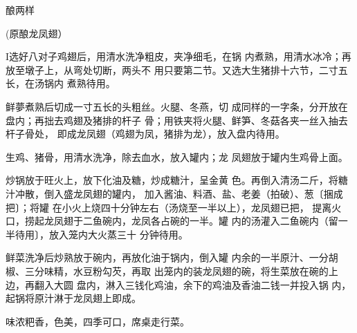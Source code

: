 \begin{recipe}{酿两样}

(原酿龙凤翅）

\ingredients


\cooking

I选好八对子鸡翅后，用清水洗净粗皮，夹净细毛，在锅 内煮熟，用清水冰冷；再放至墩子上，从弯处切断，两头不 用只要第二节。又选大生猪排十六节，二寸五长，在汤锅内 煮熟待用。

\step 	鲜夢煮熟后切成一寸五长的头粗丝。火腿、冬燕，切 成同样的一字条，分开放在盘内；再拙去鸡翅及猪排的杆子 骨；用铁夹将火腿、鲜笋、冬菇各夹一丝入抽去杆子骨处， 即成龙凤翅（鸡翅为凤，猪排为龙），放入盘内待用。

\step 	生鸡、猪骨，用清水洗净，除去血水，放入罐内；龙 凤翅放于罐内生鸡骨上面。

\step 	炒锅放于旺火上，放下化油及糖，炒成糖汁，呈金黄 色。再倒入清汤二斤，将糖汁冲散，倒入盛龙凤翅的罐内， 加入酱油、料酒、盐、老姜（拍破）、葱〔捆成把〕；将罐 在小火上烧四十分钟左右（汤烧至一半以上），龙凤翅已把， 提离火口，捞起龙凤翅于二鱼碗内，龙凤各占碗的一半。罐 内的汤灌入二鱼碗内（留一半待用〕，放入笼内大火蒸三十 分钟待用。

\step 	鲜菜洗净后炒熟放于碗内，再放化油于锅内，倒入罐 内余的一半原汁、一分胡椒、三分味精，水豆粉勾芡，再取 出笼内的装龙凤翅的碗，将生菜放在碗的上边，再翻入大圆 盘内，淋入三钱化鸡油，余下的鸡油及香油二钱一并投入锅 内，起锅将原汁淋于龙凤翅上即成。

\notes

味浓粑香，色美，四季可口，席桌走行菜。

\end{recipe}

